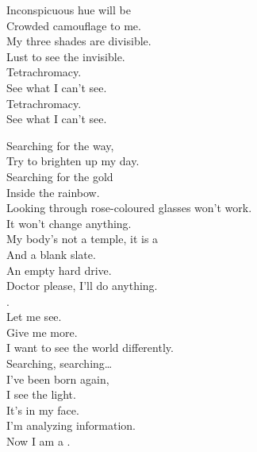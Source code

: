 Inconspicuous hue will be \\
Crowded camouflage to me. \\
My three shades are divisible. \\
Lust to see the invisible. \\

Tetrachromacy. \\
See what I can't see. \\
Tetrachromacy. \\
See what I can't see. \\





Searching for the way, \\
Try to brighten up my day. \\
Searching for the gold \\
Inside the rainbow. \\
Looking through rose-coloured glasses won't work. \\
It won't change anything. \\

My body's not a temple, it is a  \\
And a blank slate. \\
An empty hard drive. \\
Doctor please, I'll do anything. \\
. \\
Let me see. \\
Give me more. \\
I want to see the world differently. \\

Searching, searching… \\

I've been born again, \\
I see the light. \\
It's in my face. \\
I'm analyzing information. \\
Now I am a . \\



